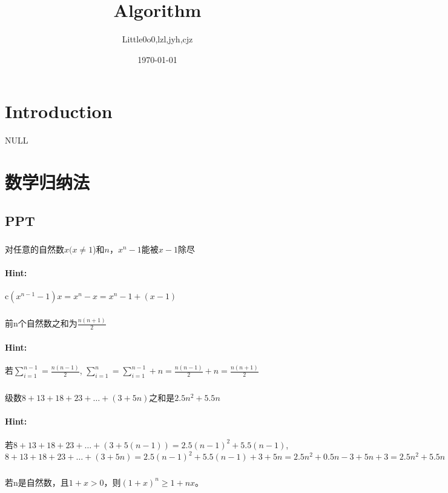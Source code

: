 \documentclass{article}
\title{Algorithm}
\author{Little0o0,lzl,jyh,cjz}
\date{\today}
\begin{document}
 


\maketitle

\section{Introduction}
    NULL

\section{数学归纳法} 
\subsection{PPT}
    \subsubsection{}对任意的自然数$x(x \ne 1$)和$n$，$x^{n}
-1$能被$x-1$除尽
    \paragraph{Hint:} c$(x^{n-1}-1)x = x^{n} - x = x^{n} - 1 + (x - 1) $

    \subsubsection{}前n个自然数之和为$\frac{n(n+1)}{2}$
    \paragraph{Hint:} 若$\sum_{i=1}^{n-1} = \frac{n(n-1)}{2}$, $\sum_{i=1}^{n} =\sum_{i=1}^{n-1} + n = \frac{n(n-1)}{2} + n = \frac{n(n+1)}{2}$
    
    \subsubsection{}级数$8+13+18+23+…+(3+5n)$之和是$2.5n^{2}+5.5n$
    \paragraph{Hint:} 若$8+13+18+23+…+(3+5(n-1)) = 2.5(n-1)^{2}+5.5(n-1)$,$8+13+18+23+…+(3+5n) = 2.5(n-1)^{2}+5.5(n-1) + 3+5n = 2.5n^{2}+ 0.5n -3 + 5n +3 = 2.5n^{2}+5.5n $
    
    \subsubsection{}若n是自然数，且$1+x>0$，则$(1+x)^{n}\geq 1+nx $。
\end{document}
